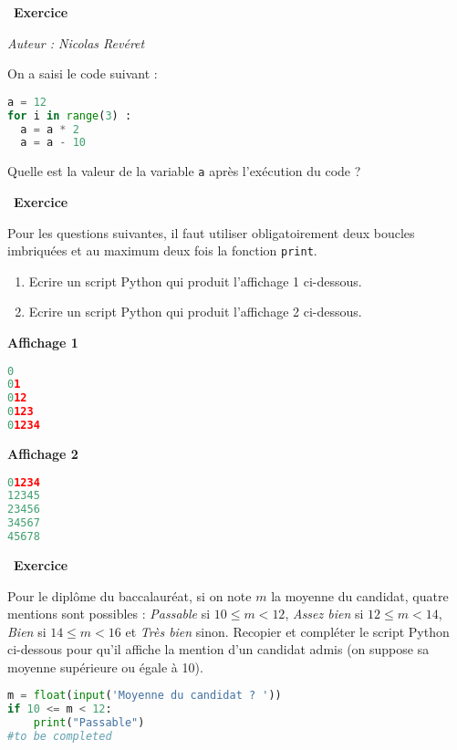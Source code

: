 \documentclass[
  11pt,
]{article}
\newcommand{\passthrough}[1]{#1}
\providecommand{\tightlist}{%
  \setlength{\itemsep}{0pt}\setlength{\parskip}{0pt}}
\newcounter{exo}
\newenvironment{exercice}[1]
{\par \medskip   \addtocounter{exo}{1} \noindent  
\begin{bclogo}[arrondi =0.1,   noborder = true, logo=\bccrayon, marge=4]{~\textbf{Exercice} \textbf{\theexo} {\itshape #1} }  \par}
{
\end{bclogo}
 \par \bigskip }
\newcounter{def}
\begin{document}
\begin{exercice}{}

\emph{Auteur : Nicolas Revéret}

On a saisi le code suivant :

\begin{lstlisting}[language=Python]
a = 12
for i in range(3) :
  a = a * 2
  a = a - 10
\end{lstlisting}

Quelle est la valeur de la variable \passthrough{\lstinline!a!} après
l'exécution du code ?

\end{exercice}

\begin{exercice}{}

Pour les questions suivantes, il faut utiliser obligatoirement deux
boucles imbriquées et au maximum deux fois la fonction
\passthrough{\lstinline!print!}.

\begin{enumerate}
\def\labelenumi{\arabic{enumi}.}
\tightlist
\item
  Ecrire un script Python qui produit l'affichage 1 ci-dessous.
\item
  Ecrire un script Python qui produit l'affichage 2 ci-dessous.
\end{enumerate}

\textbf{Affichage 1}

\begin{lstlisting}[language=Python]
0
01
012
0123
01234
\end{lstlisting}

\textbf{Affichage 2}

\begin{lstlisting}[language=Python]
01234
12345
23456
34567
45678
\end{lstlisting}

\end{exercice}

\begin{exercice}{}

Pour le diplôme du baccalauréat, si on note \(m\) la moyenne du
candidat, quatre mentions sont possibles : \emph{Passable} si
\(10 \leqslant m < 12\), \emph{Assez bien} si \(12 \leqslant m < 14\),
\emph{Bien} si \(14 \leqslant m < 16\) et \emph{Très bien} sinon.
Recopier et compléter le script Python ci-dessous pour qu'il affiche la
mention d'un candidat admis (on suppose sa moyenne supérieure ou égale à
10).

\begin{lstlisting}[language=Python]
m = float(input('Moyenne du candidat ? '))
if 10 <= m < 12:
    print("Passable")
#to be completed
\end{lstlisting}

\end{exercice}
\end{document}

